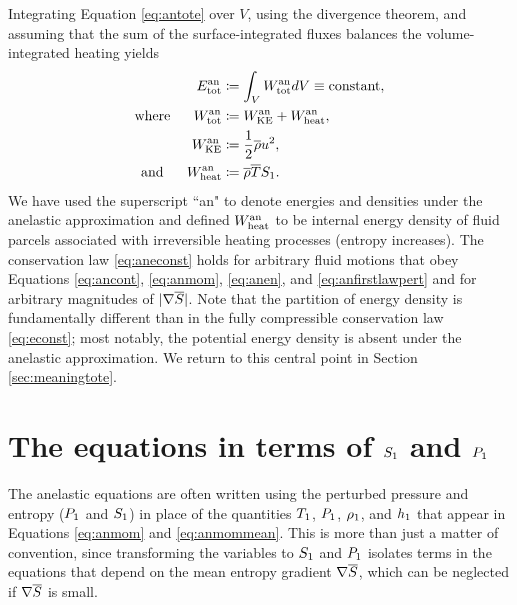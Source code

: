 \documentclass[12pt]{article}
\newcommand{\anetot}{E_{\rm tot}^{\rm an}}
\newcommand{\anwtot}{W^{\rm an}_{\rm tot}}
\newcommand{\anwke}{W^{\rm an}_{\rm KE}}
\newcommand{\anwheat}{W^{\rm an}_{\rm heat}}
\begin{document}
 Integrating Equation \eqref{eq:antote} over $V$, using the divergence theorem, and assuming that the sum of the surface-integrated fluxes balances the volume-integrated heating yields
 \begin{subequations}\label{eq:aneconst}
 	\begin{align}
 		\anetot &\define \int_V \anwtot dV \equiv \text{constant},\\
 		\where \anwtot &\define \anwke + \anwheat,\\
 		\anwke &\define \frac{1}{2}\rhoover u^2,\\
 		\andd \anwheat &\define \rhoover \tmpover S_1.
 	\end{align}
 \end{subequations}
 We have used the superscript ``an" to denote energies and densities under the anelastic approximation and defined $\anwheat$ to be internal energy density of fluid parcels associated with irreversible heating processes (entropy increases). The conservation law \eqref{eq:aneconst} holds for arbitrary fluid motions that obey Equations \eqref{eq:ancont}, \eqref{eq:anmom}, \eqref{eq:anen}, and \eqref{eq:anfirstlawpert} and for arbitrary magnitudes of $|\nabla \overline{S}|$. Note that the partition of energy density is fundamentally different than in the fully compressible conservation law \eqref{eq:econst}; most notably, the potential energy density is absent under the anelastic approximation. We return to this central point in Section \ref{sec:meaningtote}. %

\section{The \citet{Gough1969} equations in terms of $S_1$ and $P_1$}\label{sec:goughsp}
The anelastic equations are often written using the perturbed pressure and entropy ($P_1$ and $S_1$) in place of the quantities $T_1$, $P_1$, $\rho_1$, and $h_1$ that appear in Equations \eqref{eq:anmom} and \eqref{eq:anmommean}. This is more than just a matter of convention, since transforming the variables to $S_1$ and $P_1$ isolates terms in the equations that depend on the mean entropy gradient $\nabla\overline{S}$, which can be neglected if $\nabla\overline{S}$ is small.
\end{document}
